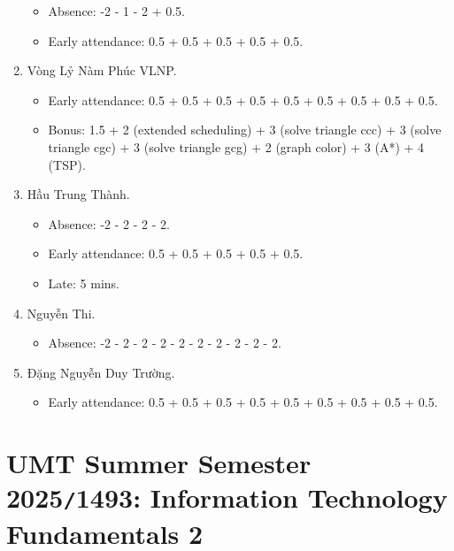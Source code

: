 \documentclass{article}
\begin{document}
\begin{enumerate}
	\begin{itemize}
		\item Absence: -2 - 1 - 2  + 0.5.
		\item Early attendance: 0.5 + 0.5 + 0.5 + 0.5 + 0.5.
	\end{itemize}
	\item {\sc Vòng Lỷ Nàm Phúc {VLNP}.}
	\begin{itemize}
		\item Early attendance: 0.5 + 0.5 + 0.5 + 0.5 + 0.5 + 0.5 + 0.5 + 0.5 + 0.5.
		\item Bonus: 1.5 + 2 (extended scheduling) + 3 (solve triangle ccc) + 3 (solve triangle cgc) + 3 (solve triangle gcg) + 2 (graph color) + 3 (A*) + 4 (TSP).
	\end{itemize}
	\item {\sc Hầu Trung Thành.}
	\begin{itemize}
		\item Absence: -2 - 2 - 2 - 2.
		\item Early attendance: 0.5 + 0.5 + 0.5 + 0.5 + 0.5.
		\item Late: 5 mins.
	\end{itemize}
	\item {\sc Nguyễn Thi.}
	\begin{itemize}
		\item Absence: -2 - 2 - 2 - 2 - 2 - 2 - 2 - 2 - 2 - 2.
	\end{itemize}
	\item {\sc Đặng Nguyễn Duy Trường.}
	\begin{itemize}
		\item Early attendance: 0.5 + 0.5 + 0.5 + 0.5 + 0.5 + 0.5 + 0.5 + 0.5 + 0.5.
	\end{itemize}
\end{enumerate}


\section{UMT Summer Semester 2025{\tt/}1493: Information Technology Fundamentals 2}
\end{document}
